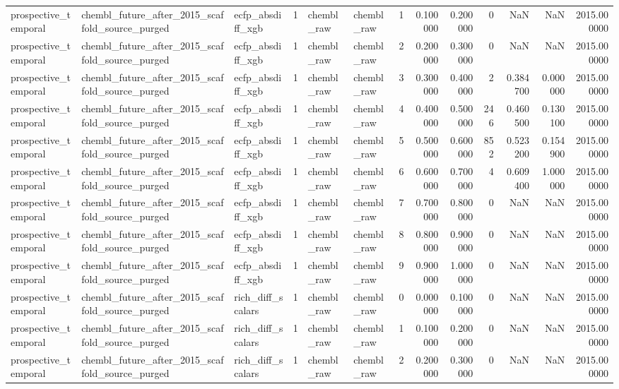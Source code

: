 \begin{longtable}{lllrllrrrrrrr}
prospective\_temporal & chembl\_future\_after\_2015\_scaffold\_source\_purged & ecfp\_absdiff\_xgb & 1 & chembl\_raw & chembl\_raw & 1 & 0.100000 & 0.200000 & 0 & NaN & NaN & 2015.000000 \\
prospective\_temporal & chembl\_future\_after\_2015\_scaffold\_source\_purged & ecfp\_absdiff\_xgb & 1 & chembl\_raw & chembl\_raw & 2 & 0.200000 & 0.300000 & 0 & NaN & NaN & 2015.000000 \\
prospective\_temporal & chembl\_future\_after\_2015\_scaffold\_source\_purged & ecfp\_absdiff\_xgb & 1 & chembl\_raw & chembl\_raw & 3 & 0.300000 & 0.400000 & 2 & 0.384700 & 0.000000 & 2015.000000 \\
prospective\_temporal & chembl\_future\_after\_2015\_scaffold\_source\_purged & ecfp\_absdiff\_xgb & 1 & chembl\_raw & chembl\_raw & 4 & 0.400000 & 0.500000 & 246 & 0.460500 & 0.130100 & 2015.000000 \\
prospective\_temporal & chembl\_future\_after\_2015\_scaffold\_source\_purged & ecfp\_absdiff\_xgb & 1 & chembl\_raw & chembl\_raw & 5 & 0.500000 & 0.600000 & 852 & 0.523200 & 0.154900 & 2015.000000 \\
prospective\_temporal & chembl\_future\_after\_2015\_scaffold\_source\_purged & ecfp\_absdiff\_xgb & 1 & chembl\_raw & chembl\_raw & 6 & 0.600000 & 0.700000 & 4 & 0.609400 & 1.000000 & 2015.000000 \\
prospective\_temporal & chembl\_future\_after\_2015\_scaffold\_source\_purged & ecfp\_absdiff\_xgb & 1 & chembl\_raw & chembl\_raw & 7 & 0.700000 & 0.800000 & 0 & NaN & NaN & 2015.000000 \\
prospective\_temporal & chembl\_future\_after\_2015\_scaffold\_source\_purged & ecfp\_absdiff\_xgb & 1 & chembl\_raw & chembl\_raw & 8 & 0.800000 & 0.900000 & 0 & NaN & NaN & 2015.000000 \\
prospective\_temporal & chembl\_future\_after\_2015\_scaffold\_source\_purged & ecfp\_absdiff\_xgb & 1 & chembl\_raw & chembl\_raw & 9 & 0.900000 & 1.000000 & 0 & NaN & NaN & 2015.000000 \\
prospective\_temporal & chembl\_future\_after\_2015\_scaffold\_source\_purged & rich\_diff\_scalars & 1 & chembl\_raw & chembl\_raw & 0 & 0.000000 & 0.100000 & 0 & NaN & NaN & 2015.000000 \\
prospective\_temporal & chembl\_future\_after\_2015\_scaffold\_source\_purged & rich\_diff\_scalars & 1 & chembl\_raw & chembl\_raw & 1 & 0.100000 & 0.200000 & 0 & NaN & NaN & 2015.000000 \\
prospective\_temporal & chembl\_future\_after\_2015\_scaffold\_source\_purged & rich\_diff\_scalars & 1 & chembl\_raw & chembl\_raw & 2 & 0.200000 & 0.300000 & 0 & NaN & NaN & 2015.000000 \\

\end{longtable}
